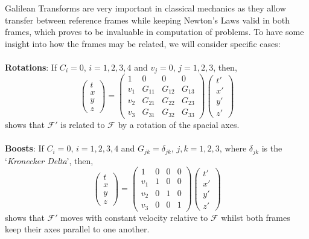 \documentclass[a4paper,12pt,draft]{report}
\begin{document}
Galilean Transforms are very important in classical mechanics as they allow transfer between reference frames while keeping Newton's Laws valid in both frames, which proves to be invaluable in computation of problems. To have some insight into how the frames may be related, we will consider specific cases:
\\
\\
\textbf{Rotations}: If $C_i = 0$, $i = 1, 2, 3, 4$ and $v_j = 0$, $j = 1, 2, 3$, then,
$$
\begin{pmatrix}t\\x\\y\\z\end{pmatrix} =
\begin{pmatrix}
1 & 0 & 0 & 0\\
v_1 & G_{11} & G_{12} & G_{13}\\
v_2 & G_{21} & G_{22} & G_{23}\\
v_3 & G_{31} & G_{32} & G_{33}
\end{pmatrix}
\begin{pmatrix}t'\\x'\\y'\\z'\end{pmatrix}
$$
shows that $\mathcal{F'}$ is related to $\mathcal{F}$ by a rotation of the spacial axes.
\\
\\
\textbf{Boosts}: If $C_i = 0$, $i = 1, 2, 3, 4$ and $G_{jk} = \delta_{jk}$, $j, k = 1, 2, 3$, where $\delta_{jk}$ is the `\emph{Kronecker Delta}', then,
$$
\begin{pmatrix}t\\x\\y\\z\end{pmatrix} =
\begin{pmatrix}
1 & 0 & 0 & 0\\
v_1 & 1 & 0 & 0\\
v_2 & 0 & 1 & 0\\
v_3 & 0 & 0 & 1
\end{pmatrix}
\begin{pmatrix}t'\\x'\\y'\\z'\end{pmatrix}
$$
shows that $\mathcal{F'}$ moves with constant velocity relative to $\mathcal{F}$ whilst both frames keep their axes parallel to one another.
\\
\end{document}
